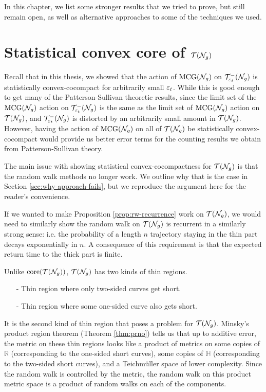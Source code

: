 In this chapter, we list some stronger results that we tried to prove, but still remain open, as well as alternative approaches to some of the techniques we used.

\section{Statistical convex core of $\mathcal{T}(\mathcal{N}_g)$}
\label{sec:stat-conv-core-of-full}

Recall that in this thesis, we showed that the action of $\mathrm{MCG}(\mathcal{N}_g)$ on $\mathcal{T}_{\varepsilon_t}^{-}(\mathcal{N}_g)$ is statistically convex-cocompact for arbitrarily small $\varepsilon_t$.
While this is good enough to get many of the Patterson-Sullivan theoretic results, since the limit set of the $\mathrm{MCG}(\mathcal{N}_g)$ action on $\mathcal{T}_{\varepsilon_t}^{-}(\mathcal{N}_g)$ is the same as the limit set of $\mathrm{MCG}(\mathcal{N}_g)$ action on $\mathcal{T}(\mathcal{N}_g)$, and $\mathcal{T}_{\varepsilon_t}^{-}(\mathcal{N}_g)$ is distorted by an arbitrarily small amount in $\mathcal{T}(\mathcal{N}_g)$.
However, having the action of $\mathrm{MCG}(\mathcal{N}_g)$ on all of $\mathcal{T}(\mathcal{N}_g)$ be statistically convex-cocompact would provide us better error terms for the counting results we obtain from Patterson-Sullivan theory.

The main issue with showing statistical convex-cocompactness for $\mathcal{T}(\mathcal{N}_g)$ is that the random walk methods no longer work.
We outline why that is the case in Section \ref{sec:why-approach-fails}, but we reproduce the argument here for the reader's convenience.

If we wanted to make Proposition \ref{prop:rw-recurrence} work on $\mathcal{T}(\mathcal{N}_g)$, we would need to similarly show the random walk on $\mathcal{T}(\mathcal{N}_g)$ is recurrent in a similarly strong sense: i.e. the probability of a length $n$ trajectory staying in the thin part decays exponentially in $n$.
A consequence of this requirement is that the expected return time to the thick part is finite.

Unlike $\mathrm{core}(\mathcal{T}(\mathcal{N}_g))$, $\mathcal{T}(\mathcal{N}_g)$ has two kinds of thin regions.
\begin{itemize}
\item[-] Thin region where only two-sided curves get short.
\item[-] Thin region where some one-sided curve also gets short.
\end{itemize}

It is the second kind of thin region that poses a problem for $\mathcal{T}(\mathcal{N}_g)$.
Minsky's product region theorem (Theorem \ref{thm:prno}) tells us that up to additive error, the metric on these thin regions looks like a product of metrics on some copies of $\mathbb{R}$ (corresponding to the one-sided short curves), some copies of $\mathbb{H}$ (corresponding to the two-sided short curves), and a Teichmüller space of lower complexity.
Since the random walk is controlled by the metric, the random walk on this product metric space is a product of random walks on each of the components.

